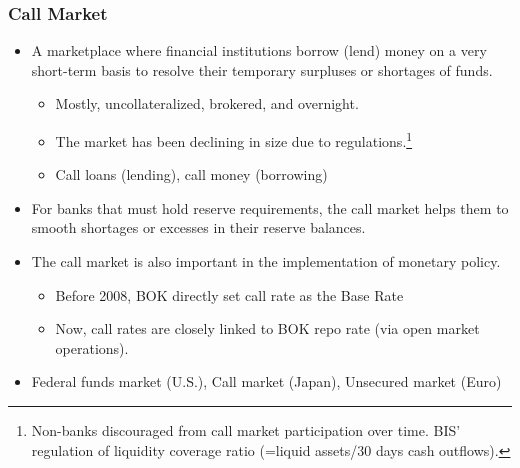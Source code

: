 \documentclass[10pt]{beamer}
\begin{document}
	\begin{frame}
		\frametitle{Call Market}
		
		\begin{itemize}  \vspace{5pt} \itemsep10pt
			\item A marketplace where financial institutions borrow (lend) money on a very short-term basis to resolve their temporary surpluses or shortages of funds. 
			\begin{itemize}  \vspace{5pt} \itemsep10pt
				\item Mostly, uncollateralized, brokered, and overnight.
				\item The market has been declining in size due to regulations.\footnote{Non-banks discouraged from call market participation over time. BIS' regulation of liquidity coverage ratio (=liquid assets/30 days cash outflows).}
				\item Call loans (lending), call money (borrowing)
			\end{itemize}
			\item For banks that must hold reserve requirements, the call market helps them to smooth shortages or excesses in their reserve balances.
			\item The call market is also important in the implementation of monetary policy. 
			\begin{itemize}  \vspace{5pt} \itemsep10pt
				\item Before 2008, BOK directly set call rate as the Base Rate 
				\item Now, call rates are closely linked to BOK repo rate (via open market operations). 
			\end{itemize}
			
			\item Federal funds market (U.S.), Call market (Japan), Unsecured market (Euro)
			

\end{itemize}
\end{frame}
\end{document}
